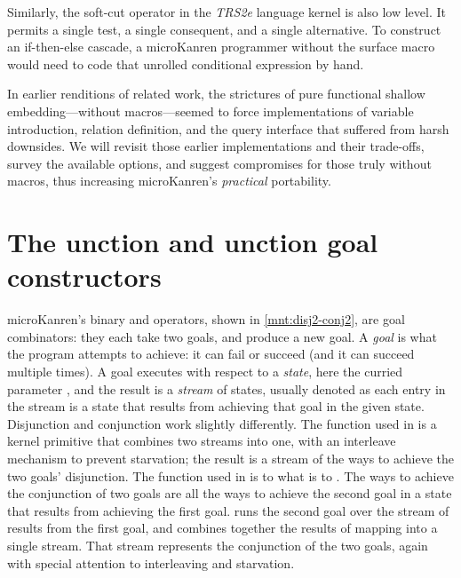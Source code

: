 \documentclass[runningheads,natbib=false]{llncs}
\begin{document}
Similarly, the soft-cut operator  in the \emph{TRS2e}
language kernel is also low level. It permits a single test, a single
consequent, and a single alternative. To construct an if-then-else
cascade, a microKanren programmer without the 
surface macro would need to code that unrolled conditional expression
by hand.

In earlier renditions of related work, the strictures of pure
functional shallow embedding---without macros---seemed to force
implementations of variable introduction, relation definition, and the
query interface that suffered from harsh downsides. We will revisit
those earlier implementations and their trade-offs, survey the
available options, and suggest compromises for those
truly without macros, thus increasing microKanren's \emph{practical}
portability.

\section{The \textmd{}unction and \textmd{}unction
  goal constructors}\label{sec:conde}

microKanren's binary  and 
operators, shown in \cref{mnt:disj2-conj2}, are goal combinators: they
each take two goals, and produce a new goal. A \emph{goal} is what the
program attempts to achieve: it can fail or succeed (and it can
succeed multiple times). A goal executes with respect to a
\emph{state}, here the curried parameter , and the
result is a \emph{stream} of states, usually denoted 
as each entry in the stream is a state that results from achieving
that goal in the given state. Disjunction and conjunction work
slightly differently. The  function used in
 is a kernel primitive that combines two streams
into one, with an interleave mechanism to prevent starvation; the
result is a stream of the ways to achieve the two goals' disjunction.
The  function used in  is to
 what  is to
. The ways to achieve the conjunction of two goals
are all the ways to achieve the second goal in a state that results
from achieving the first goal.\@ {} runs the
second goal over the stream of results from the first goal, and
combines together the results of mapping into a single stream. That
stream represents the conjunction of the two goals, again with special
attention to interleaving and starvation.
\end{document}
